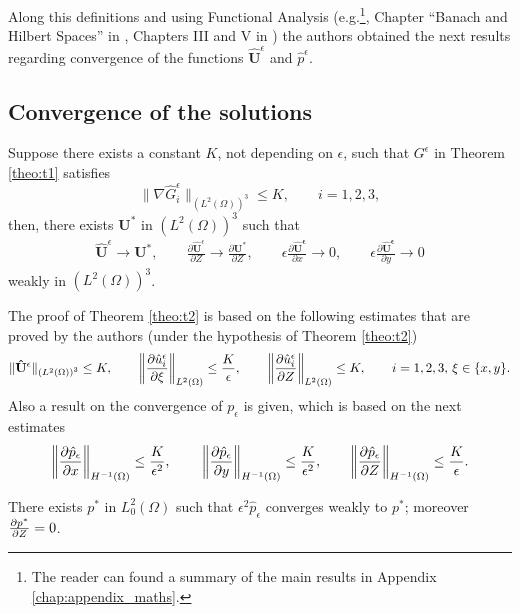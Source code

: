 Along this definitions and using Functional Analysis (e.g.\footnote{The reader can found a summary of the main results in Appendix \ref{chap:appendix_maths}.}, Chapter ``Banach and Hilbert Spaces'' in \cite{trudinger1983}, Chapters III and V in \cite{adams1975}) the authors \cite{chambat1986} obtained the next results regarding convergence of the functions $\mathbf{\hat{U}}^\epsilon$ and $\hat{p}^\epsilon$.
\subsection*{Convergence of the solutions}
\begin{theorem}\label{theo:t2}
Suppose there exists a constant $K$, not depending on $\epsilon$, such that $G^\epsilon$ in Theorem \ref{theo:t1} satisfies
\begin{equation}
\|\nabla \hat{G}_i^\epsilon\|_{\left(L^2(\Omega)\right)^3}\leq K,\qquad i=1,2,3,\label{eq:rest_G}
\end{equation}
then, there exists $\mathbf{U}^*$ in $(L^2( \Omega))^3$ such that
\begin{align*}
\mathbf{\hat{U}}^\epsilon \rightarrow \mathbf{U}^*,\qquad \frac{\partial \mathbf{\hat{U}}^\epsilon}{\partial Z} \rightarrow \frac{\partial \mathbf{U}^*}{\partial Z},\qquad \epsilon \frac{\partial \mathbf{\hat{U}^\epsilon}}{\partial x} \rightarrow 0,\qquad \epsilon \frac{\partial \mathbf{\hat{U}^\epsilon}}{\partial y} \rightarrow 0
\end{align*}
weakly in $(L^2( \Omega))^3$.
\end{theorem}
The proof of Theorem \ref{theo:t2} is based on the following estimates that are proved by the authors \cite{chambat1986} (under the hypothesis of Theorem \ref{theo:t2})
$$\|\mathbf{\hat{U}^\epsilon}\|_{\left({L^{2}(\Omega)}\right)^3}\leq K,\qquad \left\lVert\frac{\partial \hat{u}_i^\epsilon}{\partial \xi}\right\rVert_{L^{2}(\Omega)}\leq \frac{K}{\epsilon},\qquad \left\lVert\frac{\partial \hat{u}^\epsilon_i}{\partial Z}\right\rVert_{L^{2}(\Omega)}\leq K,\qquad i=1,2,3,\,\xi\in\{x,y\}.$$
Also a result on the convergence of $p_\epsilon$ is given, which is based on the next estimates
$$\left\lVert \frac{\partial \hat{p}_\epsilon}{\partial x}\right\rVert_{H^{-1}(\Omega)} \leq \frac{K}{\epsilon^2},\,\qquad \left\lVert \frac{\partial \hat{p}_\epsilon}{\partial y}\right\rVert_{H^{-1}(\Omega)} \leq \frac{K}{\epsilon^2},\qquad  \left\lVert \frac{\partial \hat{p}_\epsilon}{\partial Z}\right\rVert_{H^{-1}(\Omega)} \leq \frac{K}{\epsilon}.$$
\begin{theorem}
There exists $p^*$ in $L_0^2(\Omega)$ such that $\epsilon^2\hat{p}_\epsilon$ converges weakly to $p^*$; moreover $\frac{\partial p^*}{\partial Z}=0$.
\end{theorem}
